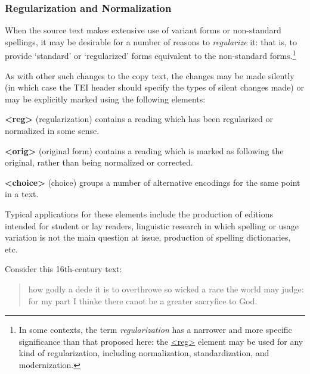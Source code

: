 \subsubsection[{Regularization and Normalization}]{Regularization and Normalization}\label{COEDREG}\par
When the source text makes extensive use of variant forms or non-standard spellings, it may be desirable for a number of reasons to \textit{regularize} it: that is, to provide ‘standard’ or ‘regularized’ forms equivalent to the non-standard forms.\footnote{In some contexts, the term \textit{regularization} has a narrower and more specific significance than that proposed here: the \hyperref[TEI.reg]{<reg>} element may be used for any kind of regularization, including normalization, standardization, and modernization.}\par
As with other such changes to the copy text, the changes may be made silently (in which case the TEI header should specify the types of silent changes made) or may be explicitly marked using the following elements: 
\begin{sansreflist}
  
\item [\textbf{<reg>}] (regularization) contains a reading which has been regularized or normalized in some sense.
\item [\textbf{<orig>}] (original form) contains a reading which is marked as following the original, rather than being normalized or corrected.
\item [\textbf{<choice>}] (choice) groups a number of alternative encodings for the same point in a text.
\end{sansreflist}
\par
Typical applications for these elements include the production of editions intended for student or lay readers, linguistic research in which spelling or usage variation is not the main question at issue, production of spelling dictionaries, etc.\par
Consider this 16th-century text: 
\begin{quote}how godly a dede it is to overthrowe so wicked a race the world may judge: for my part I thinke there canot be a greater sacryfice to God.\end{quote}
\par
